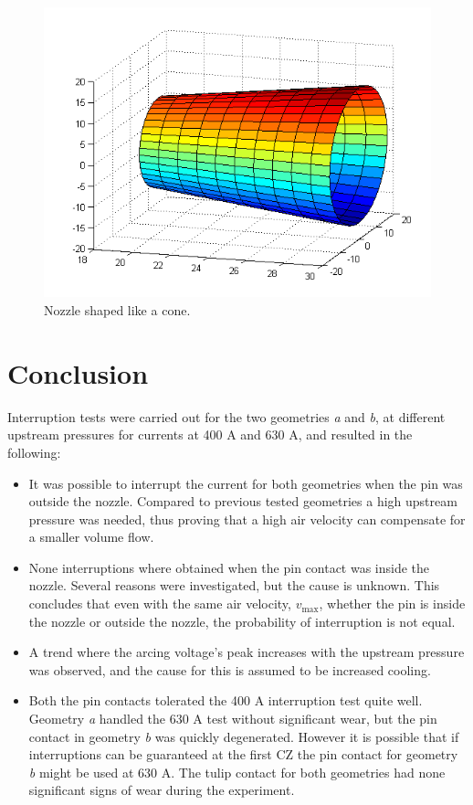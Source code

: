 \documentclass[10pt,a4paper,twoside]{article}
\begin{document}
\begin{figure}[H]
\centering
\includegraphics[scale=0.36]{Bilder/Discussion/cone_D16.png}
\caption{Nozzle shaped like a cone.} \label{fig:cone_D16}
\end{figure}

\cleardoublepage

\section{Conclusion}
Interruption tests were carried out for the two geometries \textit{a} and \textit{b}, at different upstream pressures for currents at 400 A and 630 A, and resulted in the following:
\begin{itemize}
\item	It was possible to interrupt the current for both geometries when the pin was outside the nozzle. Compared to previous tested geometries a high upstream pressure was needed, thus proving that a high air velocity can compensate for a smaller volume flow.
\item	None interruptions where obtained when the pin contact was inside the nozzle. Several reasons were investigated, but the cause is unknown. This concludes that even with the same air velocity, $v_\mathrm{{max}}$, whether the pin is inside the nozzle or outside the nozzle, the probability of interruption is not equal. 
\item	A trend where the arcing voltage's peak increases with the upstream pressure was observed, and the cause for this is assumed to be increased cooling.
\item Both the pin contacts tolerated the 400 A interruption test quite well. Geometry \textit{a} handled the 630 A test without significant wear, but the pin contact in geometry \textit{b} was quickly degenerated. However it is possible that if interruptions can be guaranteed at the first CZ the pin contact for geometry \textit{b} might be used at 630 A. The tulip contact for both geometries had none significant signs of wear during the experiment.
\end{itemize}
\end{document}
